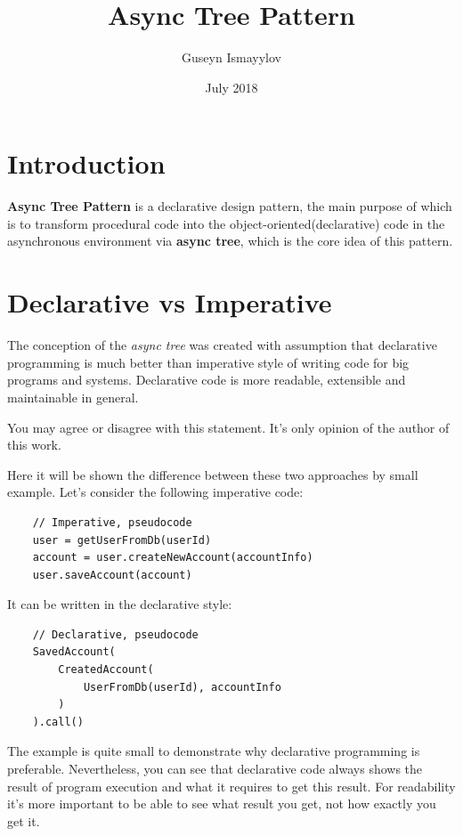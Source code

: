 \documentclass{article}
\title{Async Tree Pattern}
\author{Guseyn Ismayylov}
\date{July 2018}
\begin{document}
\newcommand{\cit}[1]{\texttt{#1}}

\maketitle

\section{Introduction}

\textbf{Async Tree Pattern} is a declarative design pattern, the main purpose of which is to transform procedural code into the object-oriented(declarative) code in the asynchronous environment via \textbf{async tree}, which is the core idea of this pattern.

\section{Declarative vs Imperative}

The conception of the \textit{async tree} was created with assumption that declarative programming is much better than imperative style of writing code for big programs and systems. Declarative code is more readable, extensible and maintainable in general.

You may agree or disagree with this statement. It's only opinion of the author of this work.

Here it will be shown the difference between these two approaches by small example. Let's consider the following imperative code:  


\begin{verbatim}
    // Imperative, pseudocode
    user = getUserFromDb(userId)
    account = user.createNewAccount(accountInfo)
    user.saveAccount(account)
\end{verbatim}

It can be written in the declarative style:


\begin{verbatim}
    // Declarative, pseudocode
    SavedAccount(
        CreatedAccount(
            UserFromDb(userId), accountInfo
        )
    ).call()
\end{verbatim}

The example is quite small to demonstrate why declarative programming is preferable. Nevertheless, you can see that declarative code always shows the result of program execution and what it requires to get this result. For readability it's more important to be able to see what result you get, not how exactly you get it.
\end{document}
